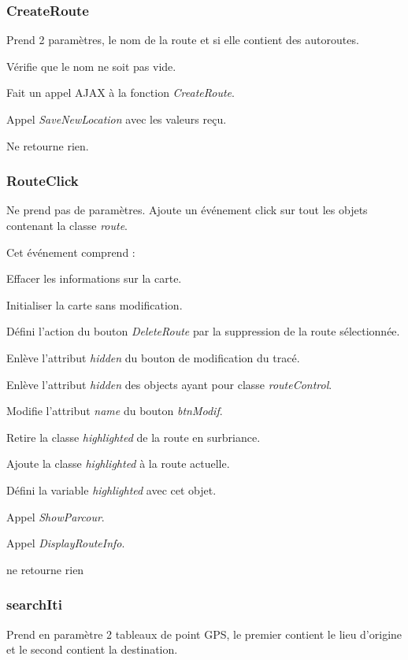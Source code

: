 \documentclass[a4paper]{article}
\newcommand{\diag}[1]{}
\begin{document}
\begin{center}
\diag{SaveNewRoute}
\end{center}

\subsubsection{CreateRoute}
Prend 2 paramètres, le nom de la route et si elle contient des autoroutes.

Vérifie que le nom ne soit pas vide.

Fait un appel AJAX à la fonction \emph{CreateRoute}.

Appel \emph{SaveNewLocation} avec les valeurs reçu.

Ne retourne rien.

\subsubsection{RouteClick}
Ne prend pas de paramètres.
Ajoute un événement click sur tout les objets contenant la classe \emph{route}.

Cet événement comprend :

Effacer les informations sur la carte.

Initialiser la carte sans modification.

Défini l'action du bouton \emph{DeleteRoute} par la suppression de la route sélectionnée.

Enlève l'attribut \emph{hidden} du bouton de modification du tracé.

Enlève l'attribut \emph{hidden} des objects ayant pour classe \emph{routeControl}.

Modifie l'attribut \emph{name} du bouton \emph{btnModif}.

Retire la classe \emph{highlighted} de la route en surbriance.

Ajoute la classe \emph{highlighted} à la route actuelle.

Défini la variable \emph{highlighted} avec cet objet.

Appel \emph{ShowParcour}.

Appel \emph{DisplayRouteInfo}.

ne retourne rien 

\subsubsection{searchIti}
Prend en paramètre 2 tableaux de point GPS, le premier contient le lieu d'origine et le second contient la destination.
\end{document}
